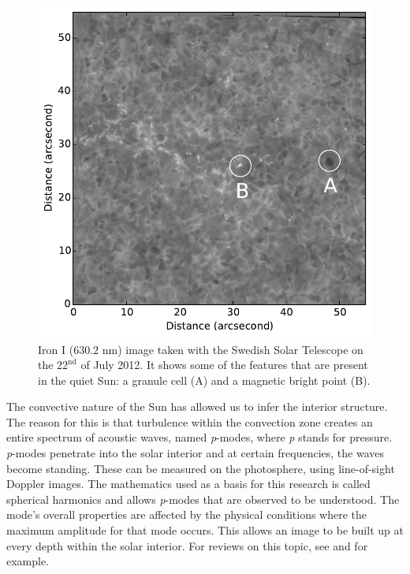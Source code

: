     \begin{figure}    
    	\centering
    	\includegraphics[width=\textwidth]{QS.pdf}
    	\caption{
    		Iron I ($630.2$ nm) image taken with the Swedish Solar Telescope on the $22^{\mathrm{nd}}$ of July 2012.
    		It shows some of the features that are present in the quiet Sun: a granule cell (A) and a magnetic bright point (B).
    	}
    	\label{fig:photosphere}        
    \end{figure}   
       
    The convective nature of the Sun has allowed us to infer the interior structure. 
    The reason for this is that turbulence within the convection zone creates an entire spectrum of acoustic waves, named \textit{p}-modes, where \textit{p} stands for pressure.
    \textit{p}-modes penetrate into the solar interior and at certain frequencies, the waves become standing.
    These can be measured on the photosphere, using line-of-sight Doppler images. 
    The mathematics used as a basis for this research is called spherical harmonics and allows \textit{p}-modes that are observed to be understood.
    The mode's overall properties are affected by the physical conditions where the maximum amplitude for that mode occurs. 
    This allows an image to be built up at every depth within the solar interior.
    For reviews on this topic, see \cite{annurev.aa.22.090184.003113} and \cite{RevModPhys.74.1073} for example.
    

